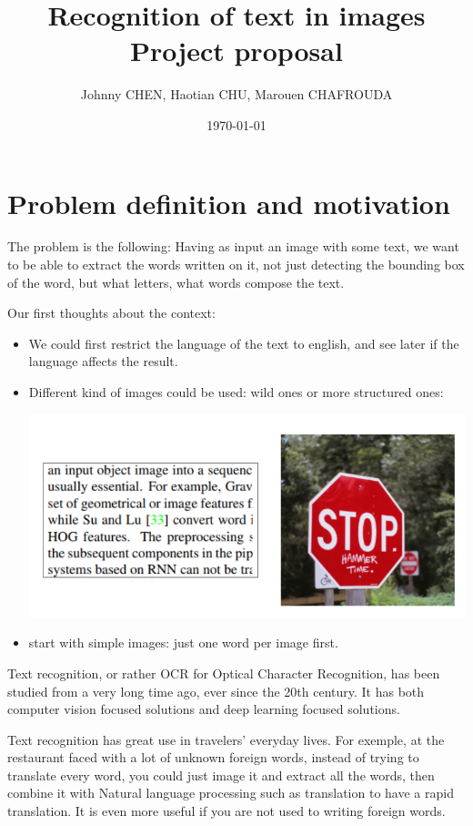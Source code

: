 \documentclass[10pt,a4paper]{article}
\title{Recognition of text in images \\ Project proposal}
\author{Johnny CHEN, Haotian CHU, Marouen CHAFROUDA}
\date{\today}
\begin{document}
\maketitle

\section{Problem definition and motivation}
The problem is the following: Having as input an image with some text, we want to be able to extract the words written on it, not just detecting the bounding box of the word, but what letters, what words compose the text.

Our first thoughts about the context:
\begin{itemize}
	\item We could first restrict the language of the text to english, and see later if the language 			affects the result.
	\item Different kind of images could be used: wild ones or more structured ones:
		\begin{center}
			\includegraphics[scale=0.5]{wild_image_ex.png}
		\end{center}
	\item start with simple images: just one word per image first.
\end{itemize}

Text recognition, or rather OCR for Optical Character Recognition, has been studied from a very long time ago, ever since the 20th century. It has both computer vision focused solutions and deep learning focused solutions. 

Text recognition has great use in travelers' everyday lives. For exemple, at the restaurant faced with a lot of unknown foreign words, instead of trying to translate every word, you could just image it and extract all the words, then combine it with Natural language processing such as translation to have a rapid translation. It is even more useful if you are not used to writing foreign words.
\end{document}
